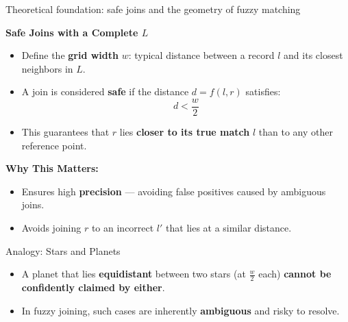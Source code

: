 \documentclass[8pt]{beamer} %
\begin{document}
\begin{frame}{Theoretical foundation: safe joins and the geometry of fuzzy matching}
	
	\textbf{Safe Joins with a Complete $L$}
	\begin{itemize}
		\item Define the \textbf{grid width} $w$: typical distance between a record $l$ and its closest neighbors in $L$.
		\item A join is considered \textbf{safe} if the distance $d = f(l, r)$ satisfies:
		$$
		d < \frac{w}{2}
		$$
		\item This guarantees that $r$ lies \textbf{closer to its true match} $l$ than to any other reference point.
	\end{itemize}
	
	\vspace{0.5em}
	\textbf{Why This Matters:}
	\begin{itemize}
		\item Ensures high \textbf{precision} — avoiding false positives caused by ambiguous joins.
		\item Avoids joining $r$ to an incorrect $l'$ that lies at a similar distance.
	\end{itemize}

	\begin{block}{Analogy: Stars and Planets}
		\begin{itemize}
			\item A planet that lies \textbf{equidistant} between two stars (at $\frac{w}{2}$ each) \textbf{cannot be confidently claimed by either}.
			\item In fuzzy joining, such cases are inherently \textbf{ambiguous} and risky to resolve.
		\end{itemize}
	\end{block}
\end{frame}
\end{document}
